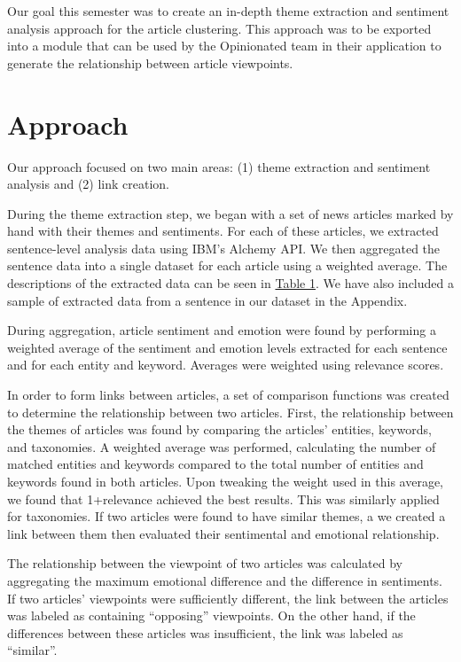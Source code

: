 \documentclass[12pt]{article}
\begin{document}
Our goal this semester was to create an in-depth theme extraction and sentiment analysis approach for the article clustering. This approach was to be exported into a module that can be used by the Opinionated team in their application to generate the relationship between article viewpoints.

\section{Approach}
Our approach focused on two main areas: (1) theme extraction and sentiment analysis and (2) link creation.

During the theme extraction step, we began with a set of news articles marked by hand with their themes and sentiments. For each of these articles, we extracted sentence-level analysis data using IBM's Alchemy API. We then aggregated the sentence data into a single dataset for each article using a weighted average. The descriptions of the extracted data can be seen in \hyperref[table:features]{Table 1}. We have also included a sample of extracted data from a sentence in our dataset in the Appendix.

During aggregation, article sentiment and emotion were found by performing a weighted average of the sentiment and emotion levels extracted for each sentence and for each entity and keyword. Averages were weighted using relevance scores.

In order to form links between articles, a set of comparison functions was created to determine the relationship between two articles. First, the relationship between the themes of articles was found by comparing the articles' entities, keywords, and taxonomies. A weighted average was performed, calculating the number of matched entities and keywords compared to the total number of entities and keywords found in both articles. Upon tweaking the weight used in this average, we found that 1+relevance achieved the best results. This was similarly applied for taxonomies. If two articles were found to have similar themes, a we created a link between them then evaluated their sentimental and emotional relationship.

The relationship between the viewpoint of two articles was calculated by aggregating the maximum emotional difference and the difference in sentiments. If two articles' viewpoints were sufficiently different, the link between the articles was labeled as containing ``opposing'' viewpoints. On the other hand, if the differences between these articles was insufficient, the link was labeled as ``similar''.
\end{document}
